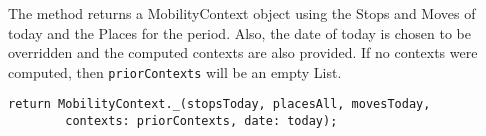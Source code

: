 The method returns a MobilityContext object using the Stops and Moves of today and the Places for the period. Also, the date of today is chosen to be overridden and the computed contexts are also provided. If no contexts were computed, then \verb|priorContexts| will be an empty List.

\begin{verbatim}
return MobilityContext._(stopsToday, placesAll, movesToday,
        contexts: priorContexts, date: today);
\end{verbatim}

